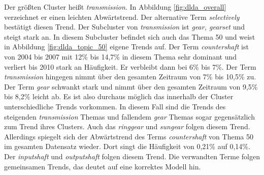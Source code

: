 Der größten Cluster heißt \emph{transmission}. In Abbildung \ref{fig:dlda_overall} verzeichnet er einen leichten Abwärtstrend. Der alternative Term \emph{selectively} bestätigt diesen Trend. Der Subcluster von \emph{transmission} ist \emph{gear, gearset} und steigt stark an. In diesem Subcluster befindet sich auch das Thema 50 und weist in Abbildung \ref{fig:dlda_topic_50} eigene Trends auf. Der Term \emph{countershaft} ist von 2004 bis 2007 mit 12\% bis 14,7\% in diesem Thema sehr dominant und verliert bis 2010 stark an Häufigkeit. Er verbleibt dann bei 6\% bis 7\%. Der Term \emph{transmission} hingegen nimmt über den gesamten Zeitraum von 7\% bis 10,5\% zu. Der Term \emph{gear} schwankt stark und nimmt über den gesamten Zeitraum von 9,5\% bis 8,2\% leicht ab. Es ist also durchaus möglich das innerhalb der Cluster unterschiedliche Trends vorkommen. In diesem Fall sind die Trends des steigenden \emph{transmission} Themas und fallendem \emph{gear} Themas sogar gegensätzlich zum Trend ihres Clusters. Auch das \emph{ringgear} und \emph{sungear} folgen diesem Trend. Allerdings spiegelt sich der Abwärtstrend des Terms \emph{countershaft} von Thema 50 im gesamten Datensatz wieder. Dort singt die Häufigkeit von 0,21\% auf 0,14\%. Der \emph{inputshaft} und \emph{outputshaft} folgen diesem Trend. Die verwandten Terme folgen gemeinsamen Trends, das deutet auf eine korrektes Modell hin.

